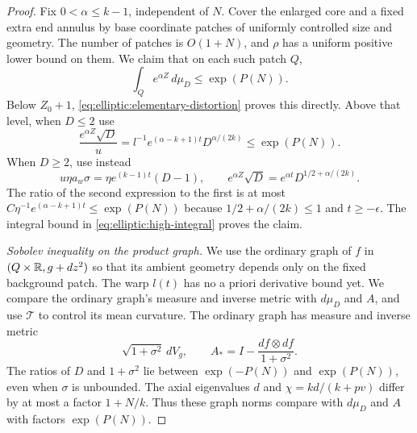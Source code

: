 \begin{proof}
Fix $0<\alpha\le k-1$, independent of $N$.  Cover the enlarged core
and a fixed extra end annulus by base coordinate patches of uniformly
controlled size and geometry.  The number of patches is $O(1+N)$,
and $\rho$ has a uniform positive lower bound on them.  We claim that
on each such patch $Q$,
\begin{equation}\label{eq:elliptic:initial-integral}
 \int_Q e^{\alpha Z}\,d\mu_D\le\exp(P(N)).
\end{equation}
Below $Z_0+1$, \eqref{eq:elliptic:elementary-distortion}
proves this directly.  Above that level, when $D\le2$ use
\[
 \frac{e^{\alpha Z}\sqrt D}{u}
   =l^{-1}e^{(\alpha-k+1)t}D^{\alpha/(2k)}
   \le\exp(P(N)).
\]
When $D\ge2$, use instead
\[
 u\eta a_w\sigma=\eta e^{(k-1)t}(D-1),\qquad
 e^{\alpha Z}\sqrt D=e^{\alpha t}D^{1/2+\alpha/(2k)}.
\]
The ratio of the second expression to the first is at most
$C\eta^{-1}e^{(\alpha-k+1)t}\le\exp(P(N))$ because
$1/2+\alpha/(2k)\le1$ and $t\ge-\epsilon$.
The integral bound in \eqref{eq:elliptic:high-integral} proves the claim.

\medskip\noindent\emph{Sobolev inequality on the product graph.}
We use the ordinary graph of $f$ in $(Q\times\mathbb R,g+dz^2)$ so that
its ambient geometry depends only on the fixed background patch.  The
warp $l(t)$ has no a priori derivative bound yet.  We compare the
ordinary graph's measure and inverse metric with $d\mu_D$ and $A$,
and use $\mathcal T$ to control its mean curvature.
The ordinary graph has measure and inverse metric
\[
 \sqrt{1+\sigma^2}\,dV_g,
 \qquad A_* = I-\frac{df\otimes df}{1+\sigma^2}.
\]
The ratios of $D$ and $1+\sigma^2$ lie between $\exp(-P(N))$ and
$\exp(P(N))$, even when $\sigma$ is unbounded.  The axial eigenvalues
$d$ and $\chi=kd/(k+pv)$ differ by at most a factor $1+N/k$.
Thus these graph norms compare with $d\mu_D$ and $A$ with factors
$\exp(P(N))$.


\end{proof}
